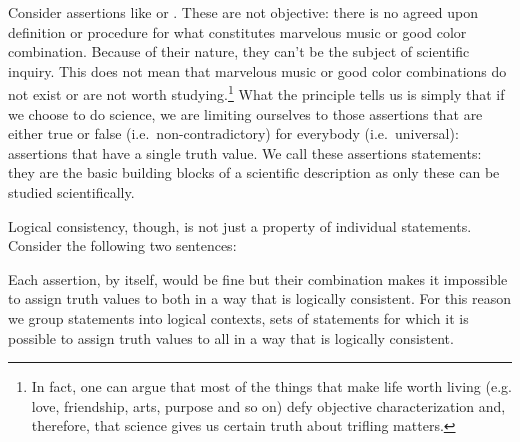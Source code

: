 \documentclass[11pt,letterpaper,fleqn]{memoir} %
\begin{document}
Consider assertions like  or . These are not objective: there is no agreed upon definition or procedure for what constitutes marvelous music or good color combination. Because of their nature, they can't be the subject of scientific inquiry. This does not mean that marvelous music or good color combinations do not exist or are not worth studying.\footnote{In fact, one can argue that most of the things that make life worth living (e.g. love, friendship, arts, purpose and so on) defy objective characterization and, therefore, that science gives us certain truth about trifling matters.} What the principle tells us is simply that if we choose to do science, we are limiting ourselves to those assertions that are either true or false (i.e.~non-contradictory) for everybody (i.e.~universal): assertions that have a single truth value. We call these assertions statements: they are the basic building blocks of a scientific description as only these can be studied scientifically.

Logical consistency, though, is not just a property of individual statements. Consider the following two sentences:
\begin{description}
	\item {}
	\item {}
\end{description}
Each assertion, by itself, would be fine but their combination makes it impossible to assign truth values to both in a way that is logically consistent. For this reason we group statements into logical contexts, sets of statements for which it is possible to assign truth values to all in a way that is logically consistent.
\end{document}
